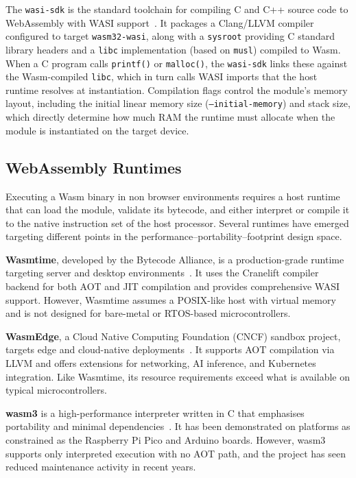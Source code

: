 \documentclass[12pt, a4paper]{report}
\begin{document}
The \texttt{wasi-sdk} is the standard toolchain for compiling C and C++ source code to
WebAssembly with WASI support~\cite{wasi-sdk}. It packages a Clang/LLVM compiler configured
to target \texttt{wasm32-wasi}, along with a \texttt{sysroot} providing C standard library
headers and a \texttt{libc} implementation (based on \texttt{musl}) compiled to Wasm. When a
C program calls \texttt{printf()} or \texttt{malloc()}, the \texttt{wasi-sdk} links these
against the Wasm-compiled \texttt{libc}, which in turn calls WASI imports that the host
runtime resolves at instantiation. Compilation flags control the module's memory layout,
including the initial linear memory size (\texttt{--initial-memory}) and stack size, which
directly determine how much RAM the runtime must allocate when the module is instantiated on
the target device.

\subsection{WebAssembly Runtimes}
\label{subsec:wasm-runtimes}

Executing a Wasm binary in non browser environments requires a host runtime that can load the module, validate its
bytecode, and either interpret or compile it to the native instruction set of the host
processor. Several runtimes have emerged targeting different points in the
performance--portability--footprint design space.

\textbf{Wasmtime}, developed by the Bytecode Alliance, is a production-grade runtime
targeting server and desktop environments~\cite{wasmtime}. It uses the Cranelift compiler
backend for both AOT and JIT compilation and provides comprehensive WASI support. However,
Wasmtime assumes a POSIX-like host with virtual memory and is not designed for bare-metal
or RTOS-based microcontrollers.

\textbf{WasmEdge}, a Cloud Native Computing Foundation (CNCF) sandbox project, targets edge
and cloud-native deployments~\cite{wasmedge}. It supports AOT compilation via LLVM and
offers extensions for networking, AI inference, and Kubernetes integration. Like Wasmtime,
its resource requirements exceed what is available on typical microcontrollers.

\textbf{wasm3} is a high-performance interpreter written in C that emphasises portability
and minimal dependencies~\cite{wasm3}. It has been demonstrated on platforms as constrained
as the Raspberry Pi Pico and Arduino boards. However, wasm3 supports only interpreted
execution with no AOT path, and the project has seen reduced maintenance activity in
recent years.
\end{document}
